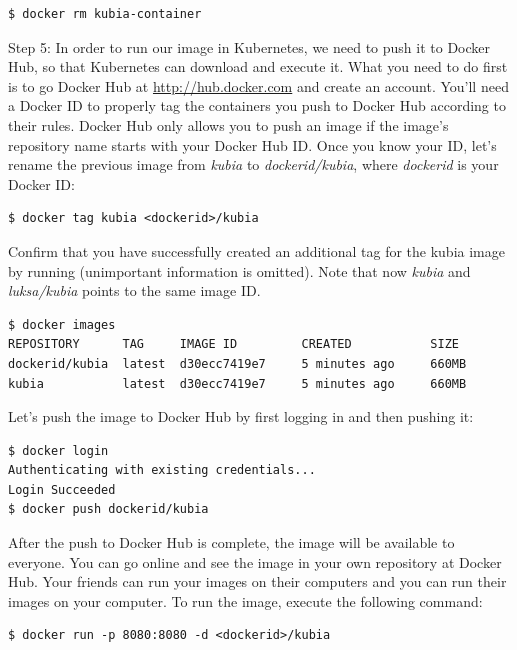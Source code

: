 \documentclass[a4paper,10pt]{article}
\begin{document}
\begin{lstlisting}[numbers=none, basicstyle=\ttfamily]
$ docker rm kubia-container
\end{lstlisting}

Step 5: In order to run our image in Kubernetes, we need to push it to Docker Hub, so that Kubernetes can download and execute it. What you need to do first is to go Docker Hub at \url{http://hub.docker.com} and create an account. You'll need a Docker ID to properly tag the containers you push to Docker Hub according to their rules. Docker Hub only allows you to push an image if the image's repository name starts with your Docker Hub ID. Once you know your ID, let's rename the previous image from \textit{kubia} to \textit{dockerid/kubia}, where \textit{dockerid} is your Docker ID:

\begin{lstlisting}[numbers=none, basicstyle=\ttfamily]
$ docker tag kubia <dockerid>/kubia
\end{lstlisting}

Confirm that you have successfully created an additional tag for the kubia image by running (unimportant information is omitted). Note that now \textit{kubia} and \textit{luksa/kubia} points to the same image ID.

\begin{lstlisting}[numbers=none, basicstyle=\ttfamily]
$ docker images
REPOSITORY    	TAG     IMAGE ID         CREATED           SIZE
dockerid/kubia  latest  d30ecc7419e7     5 minutes ago	   660MB
kubia           latest  d30ecc7419e7     5 minutes ago	   660MB
\end{lstlisting}

Let's push the image to Docker Hub by first logging in and then pushing it:

\begin{lstlisting}[numbers=none, basicstyle=\ttfamily]
$ docker login
Authenticating with existing credentials...
Login Succeeded
$ docker push dockerid/kubia
\end{lstlisting}

After the push to Docker Hub is complete, the image will be available to everyone. You can go online and see the image in your own repository at Docker Hub. Your friends can run your images on their computers and you can run their images on your computer. To run the image, execute the following command:

\begin{lstlisting}[numbers=none, basicstyle=\ttfamily]
$ docker run -p 8080:8080 -d <dockerid>/kubia
\end{lstlisting}
\end{document}
